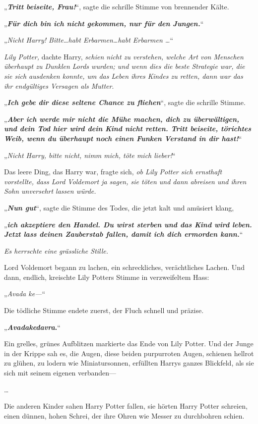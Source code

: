 {„\textbf{\emph{Tritt beiseite, Frau!}}“, sagte die schrille Stimme von brennender Kälte.

„\textbf{\emph{Für dich bin ich nicht gekommen, nur für den Jungen.}}“

„\emph{Nicht Harry! Bitte…habt Erbarmen…habt Erbarmen …}“

\emph{Lily Potter,} dachte Harry, \emph{schien nicht zu verstehen, welche Art von Menschen überhaupt zu Dunklen Lords wurden; und wenn dies die beste Strategie war, die sie sich ausdenken konnte, um das Leben ihres Kindes zu retten, dann war das ihr endgültiges Versagen als Mutter}.

„\textbf{\emph{Ich gebe dir diese seltene Chance zu fliehen}}“, sagte die schrille Stimme.

„\textbf{\emph{Aber ich werde mir nicht die Mühe machen, dich zu überwältigen, und dein Tod hier wird dein Kind nicht retten. Tritt beiseite, törichtes Weib, wenn du überhaupt noch einen Funken Verstand in dir hast!}}“

„\emph{Nicht Harry, bitte nicht, nimm mich, töte mich lieber!}“

Das leere Ding, das Harry war, fragte sich, \emph{ob Lily Potter sich ernsthaft vorstellte, dass Lord Voldemort ja sagen, sie töten und dann abreisen und ihren Sohn unversehrt lassen würde.}

„\textbf{\emph{Nun gut}}“, sagte die Stimme des Todes, die jetzt kalt und amüsiert klang,

„\textbf{\emph{ich akzeptiere den Handel. Du wirst sterben und das Kind wird leben. Jetzt lass deinen Zauberstab fallen, damit ich dich ermorden kann.}}“

\emph{Es herrschte eine grässliche Stille.}

Lord Voldemort begann zu lachen, ein schreckliches, verächtliches Lachen. Und dann, endlich, kreischte Lily Potters Stimme in verzweifeltem Hass:

„\emph{Avada ke—}“

Die tödliche Stimme endete zuerst, der Fluch schnell und präzise.

„\textbf{\emph{Avadakedavra}.}“

Ein grelles, grünes Aufblitzen markierte das Ende von Lily Potter. Und der Junge in der Krippe sah es, die Augen, diese beiden purpurroten Augen, schienen hellrot zu glühen, zu lodern wie Miniatursonnen, erfüllten Harrys ganzes Blickfeld, als sie sich mit seinem eigenen verbanden—

…

Die anderen Kinder sahen Harry Potter fallen, sie hörten Harry Potter schreien, einen dünnen, hohen Schrei, der ihre Ohren wie Messer zu durchbohren schien.

}
